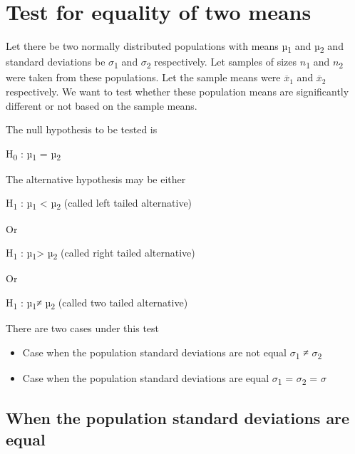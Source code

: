 \documentclass[
]{book}
\begin{document}
\hypertarget{test-for-equality-of-two-means}{%
\section{Test for equality of two means}\label{test-for-equality-of-two-means}}

Let there be two normally distributed populations with means \(µ\)\textsubscript{1} and \(µ\)\textsubscript{2} and standard deviations be \(σ\)\textsubscript{1} and \(σ\)\textsubscript{2} respectively. Let samples of sizes \(n\)\textsubscript{1} and \(n\)\textsubscript{2} were taken from these populations. Let the sample means were \(\overline{x}_{1}\) and \(\overline{x}_{2}\) respectively. We want to test whether these population means are significantly different or not based on the sample means.

The null hypothesis to be tested is

H\textsubscript{0} : \(µ\)\textsubscript{1} = \(µ\)\textsubscript{2}

The alternative hypothesis may be either

H\textsubscript{1} : \(µ\)\textsubscript{1} \textless{} \(µ\)\textsubscript{2} (called left tailed alternative)

Or

H\textsubscript{1} : \(µ\)\textsubscript{1}\textgreater{} \(µ\)\textsubscript{2} (called right tailed alternative)

Or

H\textsubscript{1} : \(µ\)\textsubscript{1}≠ \(µ\)\textsubscript{2} (called two tailed alternative)

There are two cases under this test

\begin{itemize}
\item
  Case when the population standard deviations are not equal \(σ\)\textsubscript{1} ≠ \(σ\)\textsubscript{2}
\item
  Case when the population standard deviations are equal \(σ\)\textsubscript{1} = \(σ\)\textsubscript{2} = \(σ\)
\end{itemize}

\hypertarget{when-the-population-standard-deviations-are-equal}{%
\subsection*{When the population standard deviations are equal}\label{when-the-population-standard-deviations-are-equal}}
\end{document}
